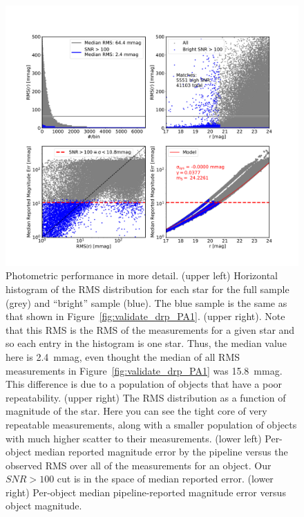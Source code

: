 \documentclass[twocolumn]{aastex62}
\begin{document}
\begin{figure}
\centering
\includegraphics[width=1.8\columnwidth]{DC1-imsim-dithered_r_check_photometry.pdf}
\caption{Photometric performance in more detail.  (upper left) Horizontal histogram of the RMS distribution for each star for the full sample (grey) and ``bright'' sample (blue).  The blue sample is the same as that shown in Figure~\ref{fig:validate_drp_PA1}. (upper right).  Note that this RMS is the RMS of the measurements for a given star and so each entry in the histogram is one star. Thus, the median value here is 2.4~mmag, even thought the median of all RMS measurements in Figure~\ref{fig:validate_drp_PA1} was 15.8~mmag.  This difference is due to a population of objects that have a poor repeatability. (upper right) The RMS distribution as a function of magnitude of the star.  Here you can see the tight core of very repeatable measurements, along with a smaller population of objects with much higher scatter to their measurements. (lower left) Per-object median reported magnitude error by the pipeline versus the observed RMS over all of the measurements for an object.  Our $SNR>100$ cut is in the space of median reported error. (lower right) Per-object median pipeline-reported magnitude error versus object magnitude. 
}
\label{fig:validate_drp_check_photometry}
\end{figure}
\end{document}
